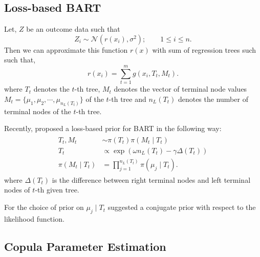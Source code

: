 \documentclass{amsart}
\begin{document}
\subsection{Loss-based BART}

Let, $Z$ be an outcome data such that 
\begin{equation*}
	Z_i \sim \mathcal{N}\left(r(x_i),\sigma^2\right);\qquad 1\le i\le n.
\end{equation*}
Then we can approximate this function $r(x)$ with sum of regression trees such such that,
\begin{equation*}
	r(x_i) = \sum_{t=1}^m g(x_i, T_t, M_t).
\end{equation*}
where $T_t$ denotes the $t$-th tree, $M_t$ denotes the vector of terminal node values $M_t = \{\mu_1,\mu_2, \cdots, \mu_{n_L(T_t)}\}$ of the $t$-th tree and $n_L(T_t)$ denotes the number of terminal nodes of the $t$-th tree. 

Recently, \citet{serafini2024lossbasedpriortreetopologies} proposed a loss-based prior for BART in the following way:
\begin{align}
	\begin{split}
		T_t, M_t &\sim \pi(T_t)\pi(M_t\mid T_t)\\
		T_t &\propto \exp\left(\omega n_L(T_t)-\gamma\Delta(T_t)\right)\\
		\pi(M_t\mid T_t) & = \prod_{j=1}^{n_L(T_t)}\pi(\mu_j\mid T_t).
	\end{split}
\end{align}
where $\Delta(T_t)$ is the difference between right terminal nodes and left terminal nodes of $t$-th given tree.

For the choice of prior on $\mu_j\mid T_t$ \citet{chipman_BART,serafini2024lossbasedpriortreetopologies} suggested a conjugate prior with respect to the likelihood function. 

\subsection{Copula Parameter Estimation}
\end{document}

